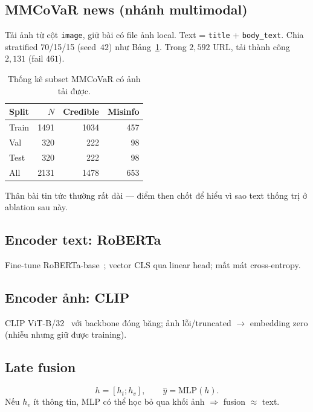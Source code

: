 \documentclass[12pt, a4paper]{report}
\begin{document}
\subsection{MMCoVaR news (nhánh multimodal)}

Tải ảnh từ cột \texttt{image}, giữ bài có file ảnh local.
Text = \texttt{title} + \texttt{body\_text}.
Chia stratified 70/15/15 (seed~$42$) như Bảng~\ref{tab:mmcovar-stats}.
Trong $2{,}592$ URL, tải thành công $2{,}131$ (fail $461$).

\begin{table}[htbp]
\centering
\caption{Thống kê subset MMCoVaR có ảnh tải được.}
\label{tab:mmcovar-stats}
\begin{tabular}{lrrr}
\hline
Split & $N$ & Credible & Misinfo \\
\hline
Train & 1491 & 1034 & 457 \\
Val   & 320 & 222 & 98 \\
Test  & 320 & 222 & 98 \\
\hline
All   & 2131 & 1478 & 653 \\
\hline
\end{tabular}
\end{table}

Thân bài tin tức thường rất dài --- điểm then chốt để hiểu vì sao text thống trị ở ablation sau này.

\subsection{Encoder text: RoBERTa}

Fine-tune RoBERTa-base~\cite{liu2019roberta}; vector CLS qua linear head; mất mát cross-entropy.

\subsection{Encoder ảnh: CLIP}

CLIP ViT-B/32~\cite{radford2021clip} với backbone đóng băng; ảnh lỗi/truncated $\rightarrow$ embedding zero (nhiễu nhưng giữ được training).

\subsection{Late fusion}

\begin{equation}
h = [h_t; h_v], \qquad \hat{y}=\mathrm{MLP}(h).
\end{equation}
Nếu $h_v$ ít thông tin, MLP có thể học bỏ qua khối ảnh $\Rightarrow$ fusion $\approx$ text.
\end{document}
